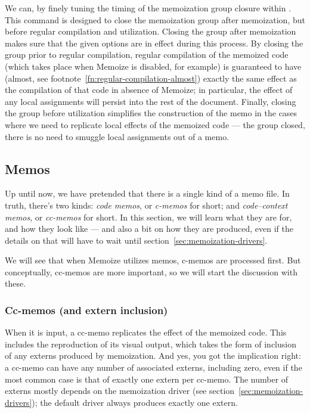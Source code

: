 \documentclass[a4paper,11pt]{article}
\begin{document}
\begin{tcolorbox}[title=\string\Memoize\ and grouping, enhanced, breakable]
  We can, by finely tuning the timing of the memoization group closure within
  .  This command is designed to close the memoization group
  after memoization, but before regular compilation and utilization.  Closing
  the group after memoization makes sure that the given options are in effect
  during this process.  By closing the group prior to regular compilation,
  regular compilation of the memoized code (which takes place when Memoize is
  disabled, for example) is guaranteed to have (almost, see
  footnote~\ref{fn:regular-compilation-almost}) exactly the same effect as the
  compilation of that code in absence of Memoize; in particular, the effect of
  any local assignments will persist into the rest of the document.  Finally,
  closing the group before utilization simplifies the construction of the memo
  in the cases where we need to replicate local effects of the memoized code
  --- the group closed, there is no need to smuggle local assignments out of a
  memo.
\end{tcolorbox}

\subsection{Memos}
\label{sec:memos}

Up until now, we have pretended that there is a single kind of a memo file.  In
truth, there's two kinds: \emph{code memos}, or \emph{c-memos} for short; and
\emph{code--context memos}, or \emph{cc-memos} for short.  In this section, we
will learn what they are for, and how they look like --- and also a bit on how
they are produced, even if the details on that will have to wait until
section~\ref{sec:memoization-drivers}.

We will see that when Memoize utilizes memos, c-memos are processed first.  But
conceptually, cc-memos are more important, so we will start the discussion with
these.

\subsubsection{Cc-memos (and extern inclusion)}
\label{sec:cc-memos}

When it is input, a cc-memo replicates the effect of the memoized code.  This
includes the reproduction of its visual output, which takes the form of
inclusion of any externs produced by memoization.  And yes, you got the
implication right: a cc-memo can have any number of associated externs,
including zero, even if the most common case is that of exactly one extern per
cc-memo.  The number of externs mostly depends on the memoization driver (see
section~\ref{sec:memoization-drivers}); the default driver always produces
exactly one extern.
\end{document}
